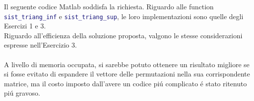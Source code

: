 \begin{center}
\footnotesize\noindent{}\end{center}

\noindent Il seguente codice Matlab soddisfa la richiesta. Riguardo alle function \lstinline[language=Matlab]{sist_triang_inf} e \lstinline[language=Matlab]{sist_triang_sup}, le loro implementazioni sono quelle degli Esercizi 1 e 3.
\\



\noindent Riguardo all'efficienza della soluzione proposta, valgono le stesse considerazioni espresse nell'Esercizio 3.
\\
\\
\noindent  A livello di memoria occupata, si sarebbe potuto ottenere un risultato migliore se si fosse evitato di espandere il vettore delle permutazioni nella sua corrispondente matrice, ma il costo imposto dall'avere un codice pi\'u complicato \'e stato ritenuto pi\'u gravoso.
